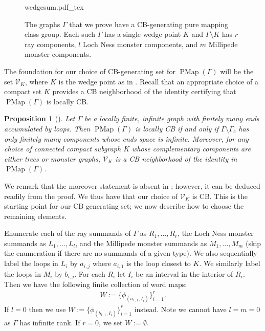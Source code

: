 \documentclass[11pt]{amsart}
\theoremstyle{plain}
\newtheorem{PROP}[THM]{Proposition}
\theoremstyle{definition}
\DeclareMathOperator{\PMap}{PMap}
\newcommand{\cV}{\mathcal{V}}
\def\G{{\Gamma}}
\newcommand{\defeq}{:=}
\newcommand{\<}{\langle}
\renewcommand{\>}{\rangle}
\begin{document}
\begin{figure}[ht!]
	    \centering
	    \def\svgwidth{.7\textwidth}
		    {wedgesum.pdf_tex}
		    \caption{The graphs $\G$ that we prove have a CB-generating pure mapping class group. Each such $\G$ has a single wedge point $K$ and $\G\setminus K$ has $r$ ray components, $l$ Loch Ness monster components, and $m$ Millipede monster components.}
	    \label{fig:wedgesum}
    \end{figure}

The foundation for our choice of CB-generating set for $\PMap(\G)$ will be the set $\cV_K$, where $K$ is the wedge point as in . Recall that an appropriate choice of a compact set $K$ provides a CB neighborhood of the identity certifying that $\PMap(\G)$ is locally CB. 
\begin{PROP}[{\cite[Proposition 8.3]{DHK2023}}]\label{prop:CBVK}
  Let $\G$ be a locally finite, infinite graph with finitely many ends
  accumulated by loops. Then $\PMap(\G)$ is locally CB if and only if $\G
  \setminus \G_c$ has only finitely many components whose ends space is
  infinite. Moreover, for any choice of connected compact subgraph $K$ whose
  complementary components are either trees or monster graphs, $\cV_K$ is a
  CB neighborhood of the identity in $\PMap(\G)$.
\end{PROP}

We remark that the moreover statement is absent in \cite[Proposition 8.3]{DHK2023}; however, it can be deduced readily from the proof. We thus have that our choice of $\cV_{K}$ is CB. This is the starting point for our CB generating set; we now describe how to choose the remaining elements. 

Enumerate each of the ray summands of $\G$ as $R_{1},\ldots,R_{r}$, the Loch Ness monster summands as $L_{1},\ldots,L_{l}$, and the Millipede monster summands as $M_{1},\ldots,M_{m}$ (skip the enumeration if there are no summands of a given type). We also sequentially label the loops in $L_{i}$ by $a_{i,j}$ where $a_{i,1}$ is the loop closest to $K$. We similarly label the loops in $M_{i}$ by $b_{i,j}$.  For each $R_{i}$ let $I_{i}$ be an interval in the interior of $R_{i}$. Then we have the following finite collection of word maps:
\begin{align*}
    W \defeq \{\phi_{(a_{1,1},I_{i})}\}_{i=1}^{r}.
\end{align*}
If $l=0$ then we use $W:= \{\phi_{(b_{1,1}, I_{i})}\}_{i=1}^{r}$ instead. Note we cannot have $l=m=0$ as $\G$ has infinite rank. If $r=0$, we set $W := \emptyset$.
\end{document}
